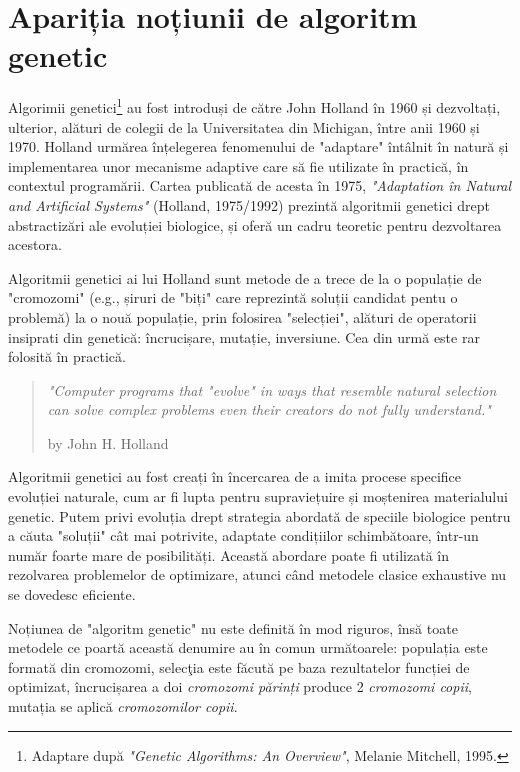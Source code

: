\section{Apariția noțiunii de algoritm genetic} 
 
Algorimii genetici\footnote{Adaptare după \textit{"Genetic Algorithms: An Overview"}, Melanie Mitchell, 1995.} au fost introduși de către John Holland în 1960 și dezvoltați, ulterior, alături de colegii de la Universitatea din Michigan, între anii 1960 și 1970. Holland urmărea înțelegerea fenomenului de "adaptare" întâlnit în natură și implementarea unor mecanisme adaptive care să fie utilizate în practică, în contextul programării. Cartea publicată de acesta în 1975, \textit{"Adaptation în Natural and Artificial Systems"} (Holland, 1975/1992) prezintă algoritmii genetici drept abstractizări ale evoluției biologice, și oferă un cadru teoretic pentru dezvoltarea acestora.

Algoritmii genetici ai lui Holland sunt metode de a trece de la o populație de "cromozomi" (e.g., șiruri de "biți" care reprezintă soluții candidat pentu o problemă) la o nouă populație, prin folosirea "selecției", alături de operatorii insiprati din genetică: încrucișare, mutație, inversiune. Cea din urmă este rar folosită în practică.

\begin{quote} 
	\textit{"Computer programs that "evolve" in ways that resemble natural selection can solve complex problems even their creators do not fully understand."}
	\begin{flushright}
		by John H. Holland 
	\end{flushright}
\end{quote}

Algoritmii genetici au fost creați în încercarea de a imita procese specifice evoluției naturale, cum ar fi lupta pentru supraviețuire și moștenirea materialului genetic. Putem privi evoluția drept strategia abordată de speciile biologice pentru a căuta "soluții" cât mai potrivite, adaptate condițiilor schimbătoare, într-un număr foarte mare de posibilități. Această abordare poate fi utilizată în rezolvarea problemelor de optimizare, atunci când metodele clasice exhaustive nu se dovedesc eficiente. 
 
Noțiunea de "algoritm genetic" nu este definită în mod riguros\cite{introduction_by_melanie_mitchell}, însă toate metodele ce poartă această denumire au în comun următoarele: populația este formată din cromozomi, selecţia este făcută pe baza rezultatelor funcției de optimizat, încrucișarea a doi \textit{cromozomi părinți} produce 2 \textit{cromozomi copii}, mutația se aplică \textit{cromozomilor copii}. 

